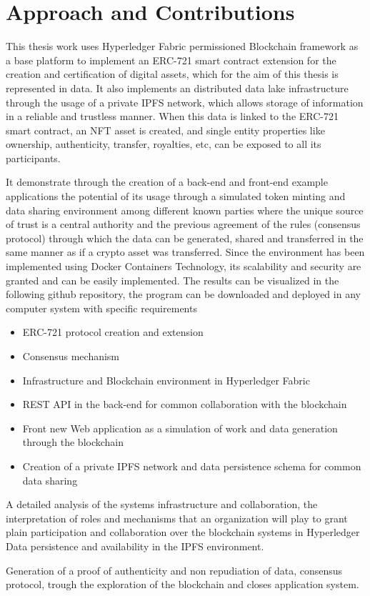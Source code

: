 \section{Approach and Contributions}

This thesis work uses Hyperledger Fabric permissioned Blockchain framework as a base platform to implement an ERC-721 smart contract extension for the creation and certification of digital assets, which for the aim of this thesis is represented in data. 
It also implements an distributed data lake infrastructure through the usage of a private IPFS network, which allows storage of information in a reliable and trustless manner. When this data is linked to the ERC-721 smart contract, an NFT asset is created, and single entity properties like ownership, authenticity, transfer, royalties, etc, can be exposed to all its participants.

It demonstrate through the creation of a back-end and front-end example applications the potential of its usage through a simulated token minting and data sharing environment among different known parties where the unique source of trust is a central authority and the previous agreement of the rules (consensus protocol) through which the data can be generated, shared and transferred in the same manner as if a crypto asset was transferred. Since the environment has been implemented using Docker Containers Technology, its scalability and security are granted and can be easily implemented.  The results can be visualized in  the following github repository, the program can be downloaded and deployed in any computer system with specific requirements
\begin{itemize}
    \item ERC-721 protocol creation and extension
    \item Consensus mechanism
    \item Infrastructure and Blockchain environment in Hyperledger Fabric
    \item REST API in the back-end for common collaboration with the blockchain
    \item Front new Web application as a simulation of  work and data generation through the blockchain
    \item Creation of a private IPFS network and data persistence schema for common data sharing
\end{itemize}

A detailed analysis of the systems infrastructure and collaboration, the interpretation of roles and mechanisms that an organization will play to grant plain participation and collaboration over the blockchain systems in Hyperledger
Data persistence and availability in the IPFS environment.

Generation of a proof of authenticity and non repudiation of data, consensus protocol, trough the exploration of the blockchain and closes application system.